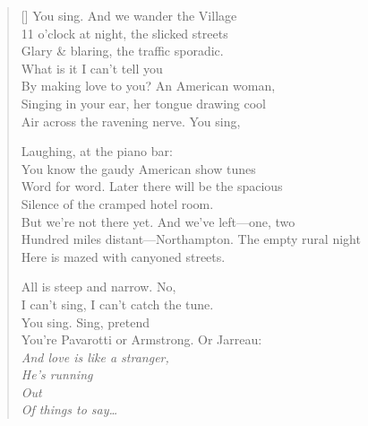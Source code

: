 \label{ch:lovers}
\settowidth{\versewidth}{Hundred miles distant—Northampton. The empty rural night}
\begin{verse}[\versewidth]
You sing. And we wander the Village\\
11 o'clock at night, the slicked streets\\
Glary \& blaring, the traffic sporadic.\\
What is it I can't tell you\\
By making love to you? An American woman,\\
Singing in your ear, her tongue drawing cool\\
Air across the ravening nerve. You sing,

Laughing, at the piano bar:\\
You know the gaudy American show tunes\\
Word for word. Later there will be the spacious\\
Silence of the cramped hotel room.\\
But we're not there yet. And we've left---one, two\\
Hundred miles distant---Northampton. The empty rural night\\
Here is mazed with canyoned streets.

All is steep and narrow. No,\\
I can't sing, I can't catch the tune.\\
You sing. Sing, pretend\\
You're Pavarotti or Armstrong. Or Jarreau:\\
\textit{And love is like a stranger,\\
He's running\\
Out\\
Of things to say\ldots}
\end{verse}

